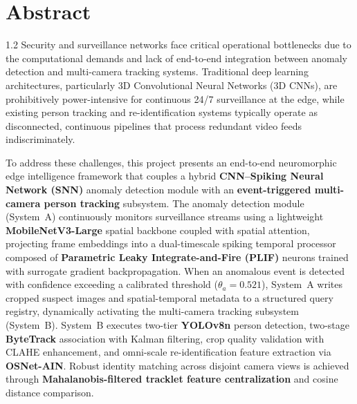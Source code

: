 \chapter*{Abstract}%
%
\vspace{-25pt}

\begin{spacing}{1.2}
\noindent Security and surveillance networks face critical operational bottlenecks due to the computational demands and lack of end-to-end integration between anomaly detection and multi-camera tracking systems. Traditional deep learning architectures, particularly 3D Convolutional Neural Networks (3D CNNs), are prohibitively power-intensive for continuous 24/7 surveillance at the edge, while existing person tracking and re-identification systems typically operate as disconnected, continuous pipelines that process redundant video feeds indiscriminately. 

\vspace{8pt}

\noindent To address these challenges, this project presents an end-to-end neuromorphic edge intelligence framework that couples a hybrid \textbf{CNN--Spiking Neural Network (SNN)} anomaly detection module with an \textbf{event-triggered multi-camera person tracking} subsystem. The anomaly detection module (System~A) continuously monitors surveillance streams using a lightweight \textbf{MobileNetV3-Large} spatial backbone coupled with spatial attention, projecting frame embeddings into a dual-timescale spiking temporal processor composed of \textbf{Parametric Leaky Integrate-and-Fire (PLIF)} neurons trained with surrogate gradient backpropagation. When an anomalous event is detected with confidence exceeding a calibrated threshold ($\theta_a = 0.521$), System~A writes cropped suspect images and spatial-temporal metadata to a structured query registry, dynamically activating the multi-camera tracking subsystem (System~B). System~B executes two-tier \textbf{YOLOv8n} person detection, two-stage \textbf{ByteTrack} association with Kalman filtering, crop quality validation with CLAHE enhancement, and omni-scale re-identification feature extraction via \textbf{OSNet-AIN}. Robust identity matching across disjoint camera views is achieved through \textbf{Mahalanobis-filtered tracklet feature centralization} and cosine distance comparison.

\vspace{8pt}


\end{spacing}
